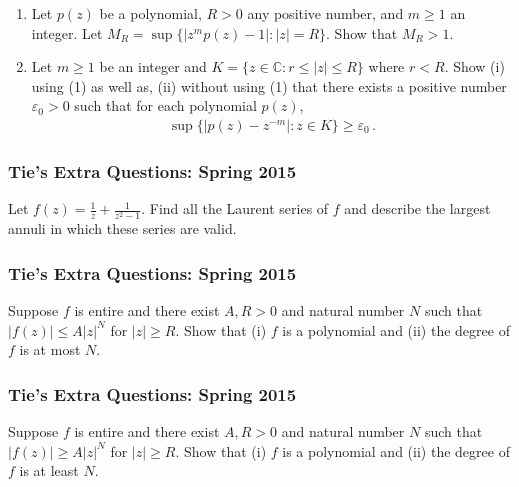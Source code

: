 \begin{enumerate}
\def\labelenumi{(\arabic{enumi})}
\item
  Let \(p(z)\) be a polynomial, \(R>0\) any positive number, and
  \(m \geq 1\) an integer. Let
  \(M_R = \sup \{ |z^{m} p(z) - 1|: |z| = R \}\). Show that \(M_R>1\).
\item
  Let \(m \geq 1\) be an integer and
  \(K = \{z \in {\mathbb C}: r \leq |z| \leq R \}\) where \(r<R\). Show
  (i) using (1) as well as, (ii) without using (1) that there exists a
  positive number \(\varepsilon_0>0\) such that for each polynomial
  \(p(z)\),
  \begin{align*}\sup \{|p(z) - z^{-m}|: z \in K  \} \geq \varepsilon_0 \, .\end{align*}
\end{enumerate}

\hypertarget{ties-extra-questions-spring-2015-4}{%
\subsubsection{Tie's Extra Questions: Spring
2015}\label{ties-extra-questions-spring-2015-4}}

Let \(\displaystyle f(z) = \frac{1}{z} + \frac{1}{z^2 -1}\). Find all
the Laurent series of \(f\) and describe the largest annuli in which
these series are valid.

\hypertarget{ties-extra-questions-spring-2015-5}{%
\subsubsection{Tie's Extra Questions: Spring
2015}\label{ties-extra-questions-spring-2015-5}}

Suppose \(f\) is entire and there exist \(A, R >0\) and natural number
\(N\) such that \(|f(z)| \leq A |z|^N\) for \(|z| \geq R\). Show that
(i) \(f\) is a polynomial and (ii) the degree of \(f\) is at most \(N\).

\hypertarget{ties-extra-questions-spring-2015-6}{%
\subsubsection{Tie's Extra Questions: Spring
2015}\label{ties-extra-questions-spring-2015-6}}

Suppose \(f\) is entire and there exist \(A, R >0\) and natural number
\(N\) such that \(|f(z)| \geq A |z|^N\) for \(|z| \geq R\). Show that
(i) \(f\) is a polynomial and (ii) the degree of \(f\) is at least
\(N\).

